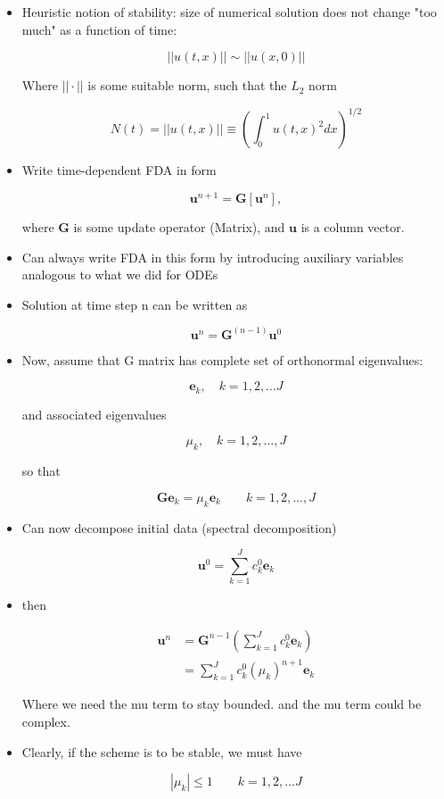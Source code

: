 \begin{itemize}
    \item Heuristic notion of stability: size of numerical solution does not change "too much" as a function of time:

    \begin{equation}
        ||u(t,x)|| \sim  ||u(x,0)||
    \end{equation}

    Where $||\cdot||$ is some suitable norm, such that the $L_2$ norm

    \begin{equation}
        N(t) = ||u(t,x)|| \equiv \left( \int_0^1 u(t,x)^2 dx\right)^{1/2}
    \end{equation}

    \item Write time-dependent FDA in form 

    \[ \mathbf{u}^{n+1} = \mathbf{G}[\mathbf{u}^n],\]

    where $\mathbf{G}$ is some update operator (Matrix), and $\mathbf{u}$ is a column vector.

    \item Can always write FDA in this form by introducing auxiliary variables analogous to what we did for ODEs

    \item Solution at time step n can be written as

    \[ \mathbf{u}^n = \mathbf{G}^{(n-1)} \mathbf{u}^0\]

    \item Now, assume that G matrix has complete set of orthonormal eigenvalues:

    \[ \mathbf{e}_k, \quad k=1,2,\ldots J\]

    and associated eigenvalues 

    \[ \mu_k, \quad k = 1,2,\ldots, J\]

    so that 

    \[ \mathbf{G} \mathbf{e}_k = \mu_k \mathbf{e}_k \qquad k=1,2,\ldots, J\]

    \item Can now decompose initial data (spectral decomposition)

    \[ \mathbf{u}^0 = \sum_{k=1}^J c_k^0 \mathbf{e}_k\]
    \item then 

    \begin{align}
    \mathbf{u}^n &= \mathbf{G}^{n-1} \left(\sum_{k=1}^J c_k^0 \mathbf{e}_k \right) \\
    &= \sum_{k=1}^J c_k^0 (\mu_k)^{n+1} \mathbf{e}_k
    \end{align}

    Where we need the mu term to stay bounded. and the mu term could be complex.
    
    \item Clearly, if the scheme is to be stable, we must have

    \[ |\mu _k| \le 1 \qquad k=1,2, \ldots J\]
\end{itemize}

